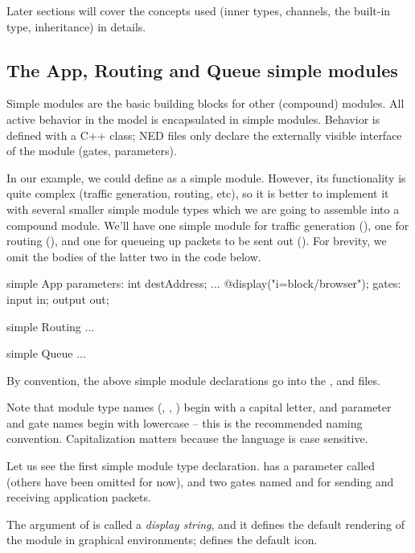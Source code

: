 Later sections will cover the concepts used (inner types, channels, the
 built-in type, inheritance) in details.


\subsection{The App, Routing and Queue simple modules}

Simple modules are the basic building blocks for other (compound) modules.
All active behavior in the model is encapsulated in simple modules.
Behavior is defined with a C++ class; NED files only declare the externally
visible interface of the module (gates, parameters).

In our example, we could define  as a simple module. However,
its functionality is quite complex (traffic generation, routing, etc),
so it is better to implement it with several smaller simple module types
which we are going to assemble into a compound module. We'll have
one simple module for traffic generation (), one for routing
(), and one for queueing up packets to be sent out ().
For brevity, we omit the bodies of the latter two in the code below.

\begin{ned}
simple App
{
    parameters:
        int destAddress;
        ...
        @display("i=block/browser");
    gates:
        input in;
        output out;
}

simple Routing
{
    ...
}

simple Queue
{
    ...
}
\end{ned}

By convention, the above simple module declarations go into the
,  and  files.

\begin{note}
    Note that module type names (, , )
    begin with a capital letter, and parameter and gate names begin with
    lowercase -- this is the recommended naming convention. Capitalization
    matters because the language is case sensitive.
\end{note}

Let us see the first simple module type declaration.  has a
parameter called  (others have been omitted for now),
and two gates named  and  for sending and receiving
application packets.

The argument of  is called a \textit{display string},
and it defines the default rendering of the module in graphical environments;
 defines the default icon.

